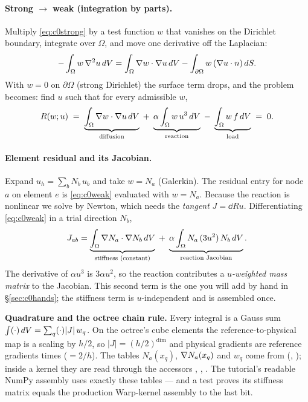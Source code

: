\paragraph{Strong $\to$ weak (integration by parts).}
Multiply \eqref{eq:c0strong} by a test function $w$ that vanishes on the
Dirichlet boundary, integrate over $\Omega$, and move one derivative off
the Laplacian:
%
\begin{equation}
  -\int_\Omega w\,\nabla^2 u \,dV
  = \int_\Omega \nabla w\cdot\nabla u \,dV - \int_{\partial\Omega} w\,(\nabla u\cdot n)\,dS .
\end{equation}
%
With $w=0$ on $\partial\Omega$ (strong Dirichlet) the surface term drops,
and the problem becomes: find $u$ such that for every admissible $w$,
%
\begin{equation}
  R(w;u) \;=\; \underbrace{\int_\Omega \nabla w\cdot\nabla u \,dV}_{\text{diffusion}}
  \;+\; \underbrace{\alpha\int_\Omega w\,u^3 \,dV}_{\text{reaction}}
  \;-\; \underbrace{\int_\Omega w\,f \,dV}_{\text{load}} \;=\; 0 .
  \label{eq:c0weak}
\end{equation}

\paragraph{Element residual and its Jacobian.}
Expand $u_h=\sum_b N_b\,u_b$ and take $w=N_a$ (Galerkin). The residual
entry for node $a$ on element $e$ is \eqref{eq:c0weak} evaluated with
$w=N_a$. Because the reaction is nonlinear we solve by Newton, which needs
the \emph{tangent} $J=\dd{R}{u}$. Differentiating \eqref{eq:c0weak} in a
trial direction $N_b$,
%
\begin{equation}
  J_{ab} = \underbrace{\int_\Omega \nabla N_a\cdot\nabla N_b \,dV}_{\text{stiffness (constant)}}
  \;+\; \underbrace{\alpha\int_\Omega N_a\,(3u^2)\,N_b \,dV}_{\text{reaction Jacobian}} .
  \label{eq:c0jac}
\end{equation}
%
The derivative of $\alpha u^3$ is $3\alpha u^2$, so the reaction contributes
a \emph{$u$-weighted mass matrix} to the Jacobian. This second term is the
one you will add by hand in \S\ref{sec:c0hands}; the stiffness term is
$u$-independent and is assembled once.

\begin{keybox}
\textbf{Quadrature and the octree chain rule.} Every integral is a
Gauss sum $\int(\cdot)\,dV=\sum_q(\cdot)|J|\,w_q$. On the octree's cube
elements the reference-to-physical map is a scaling by $h/2$, so
$|J|=(h/2)^{\text{dim}}$ and physical gradients are reference gradients
times  ($=2/h$). The tables $N_a(x_q)$, $\nabla N_a(x_q)$ and
$w_q$ come from  (,
); inside a kernel they are read through the
 accessors , ,
. The tutorial's readable NumPy assembly uses exactly
these tables --- and a test proves its stiffness matrix equals the
production Warp-kernel assembly to the last bit.
\end{keybox}

